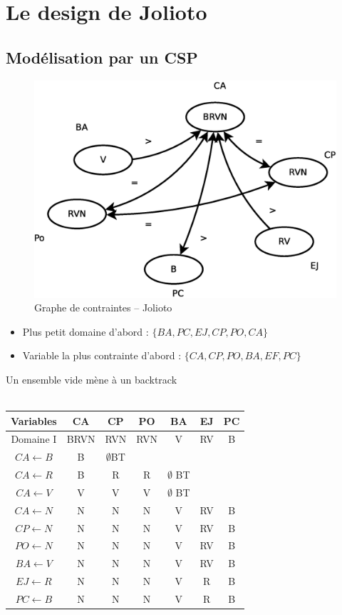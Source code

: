 \documentclass[12pt,a4paper,openany]{book}
\begin{document}
\section{Le design de Jolioto}
\subsection{Modélisation par un CSP}
\begin{figure}[H]
	\centering
	\includegraphics[width=12cm]{Diagramme18.eps}
	\caption{Graphe de contraintes -- Jolioto}
\end{figure}

\begin{itemize}
	\item Plus petit domaine d'abord : $\{BA, PC, EJ, CP, PO, CA\}$
	\item Variable la plus contrainte d'abord : $\{CA, CP, PO, BA, EF, PC\}$
\end{itemize}
\begin{remarque}
	Un ensemble vide mène à un backtrack\\~\\
\end{remarque}
\begin{table}[H]
	\centering
	\begin{tabular}{c|cccccc}
		Variables& CA & CP & PO & BA & EJ & PC\\
		\hline
		Domaine I & BRVN & RVN & RVN & V & RV & B\\
		$CA \leftarrow B$ & B & $\emptyset$BT & & \\
		\hline
		$CA \leftarrow R$ & B & R &R &$\emptyset$ BT& & \\
		\hline
		$CA \leftarrow V$ & V & V & V&$\emptyset$ BT &&\\
		\hline
		$CA \leftarrow N$ & N & N &N & V & RV & B\\
		$CP \leftarrow N$ & N & N &N & V & RV & B\\
		$PO \leftarrow N$ & N & N &N & V & RV & B\\
		$BA \leftarrow V$ & N & N &N & V & RV & B\\
		$EJ \leftarrow R$ & N & N &N & V & R  & B\\
		$PC \leftarrow B$ & N & N &N & V & R & B\\
		

	\end{tabular}
\end{table}

	\appendix
	\lstlistoflistings
\end{document}
